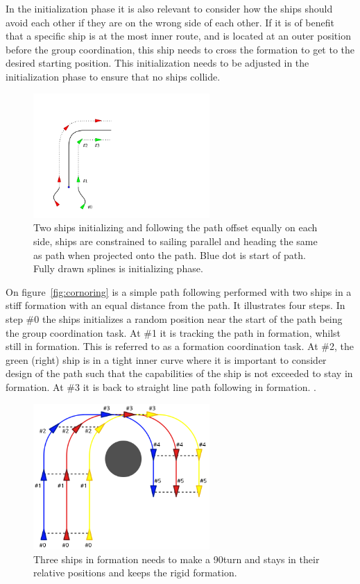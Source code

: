 In the initialization phase it is also relevant to consider how the
ships should avoid each other if they are on the wrong side of each
other. If it is of benefit that a specific ship is at the most inner route, and is located at an outer position before the group coordination, this ship needs to cross the formation to get to the desired starting position. This initialization needs to be adjusted in the initialization phase to ensure that no ships collide.

\begin{figure}[htbp]
	\centering
	\includegraphics[width=0.6\textwidth]{fig/cornoring}
	\caption{Two ships initializing and following the path offset
		equally on each side, ships are constrained to sailing parallel
		and heading the same as path when projected onto the path. Blue
	dot is start of path. Fully drawn splines is initializing phase.}
	\label{fig:cornoring}
\end{figure}

On figure~\vref{fig:cornoring} is a simple path following performed
with two ships in a stiff formation with an equal distance from the
path. It illustrates four steps. In step \#0 the ships initializes a
random position near the start of the path being the group coordination task. At \#1 it is tracking the
path in formation, whilst still in formation. This is referred to as a formation coordination task. At \#2, the green
(right) ship is in a tight inner curve where it is important to
consider design of the path such that the capabilities of the ship is not
exceeded to stay in formation. At \#3 it is back to straight line path
following in formation. \citep{thorvaldsen}.

\begin{figure}[htbp]
	\centering
	\includegraphics[width=0.6\textwidth]{fig/form_rigid_90}
	\caption{Three ships in formation needs to make a 90\textdegree turn and stays in their relative positions and keeps the rigid formation.}
	\label{fig:form_rigid_90}
\end{figure}

